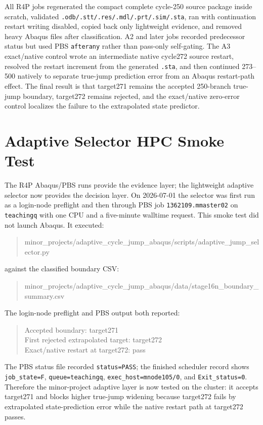 \documentclass[11pt,a4paper]{article}
\newcommand{\code}[1]{\texttt{#1}}
\begin{document}
All R4P jobs regenerated the compact complete cycle-250 source package inside scratch, validated \code{.odb/.stt/.res/.mdl/.prt/.sim/.sta}, ran with continuation restart writing disabled, copied back only lightweight evidence, and removed heavy Abaqus files after classification. A2 and later jobs recorded predecessor status but used PBS \code{afterany} rather than pass-only self-gating. The A3 exact/native control wrote an intermediate native cycle272 source restart, resolved the restart increment from the generated \code{.sta}, and then continued 273--500 natively to separate true-jump prediction error from an Abaqus restart-path effect. The final result is that target271 remains the accepted 250-branch true-jump boundary, target272 remains rejected, and the exact/native zero-error control localizes the failure to the extrapolated state predictor.

\section{Adaptive Selector HPC Smoke Test}

The R4P Abaqus/PBS runs provide the evidence layer; the lightweight adaptive selector now provides the decision layer. On 2026-07-01 the selector was first run as a login-node preflight and then through PBS job \code{1362109.mmaster02} on \code{teachingq} with one CPU and a five-minute walltime request. This smoke test did not launch Abaqus. It executed:
\begin{quote}\footnotesize\ttfamily
minor\_projects/adaptive\_cycle\_jump\_abaqus/scripts/adaptive\_jump\_selector.py
\end{quote}
against the classified boundary CSV:
\begin{quote}\footnotesize\ttfamily
minor\_projects/adaptive\_cycle\_jump\_abaqus/data/stage16n\_boundary\_summary.csv
\end{quote}

The login-node preflight and PBS output both reported:
\begin{quote}\footnotesize\ttfamily
Accepted boundary: target271\\
First rejected extrapolated target: target272\\
Exact/native restart at target272: pass
\end{quote}
The PBS status file recorded \code{status=PASS}; the finished scheduler record shows \code{job\_state=F}, \code{queue=teachingq}, \code{exec\_host=mnode105/0}, and \code{Exit\_status=0}. Therefore the minor-project adaptive layer is now tested on the cluster: it accepts target271 and blocks higher true-jump widening because target272 fails by extrapolated state-prediction error while the native restart path at target272 passes.
\end{document}
